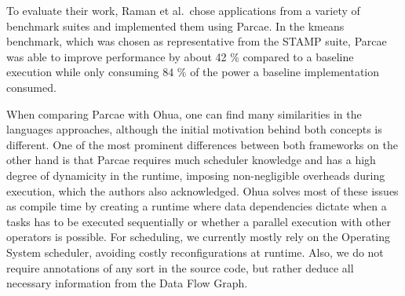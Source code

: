 To evaluate their work, Raman et al.\ chose applications from a variety of benchmark suites and implemented them using Parcae.
In the kmeans benchmark, which was chosen as representative from the STAMP suite, Parcae was able to improve performance by about 42 \% compared to a baseline execution while only consuming 84 \% of the power a baseline implementation consumed.

When comparing Parcae with Ohua, one can find many similarities in the languages approaches, although the initial motivation behind both concepts is different.
One of the most prominent differences between both frameworks on the other hand is that Parcae requires much scheduler knowledge and has a high degree of dynamicity in the runtime, imposing non-negligible overheads during execution, which the authors also acknowledged.
Ohua solves most of these issues as compile time by creating a runtime where data dependencies dictate when a tasks has to be executed sequentially or whether a parallel execution with other operators is possible.
For scheduling, we currently mostly rely on the Operating System scheduler, avoiding costly reconfigurations at runtime.
Also, we do not require annotations of any sort in the source code, but rather deduce all necessary information from the Data Flow Graph.

